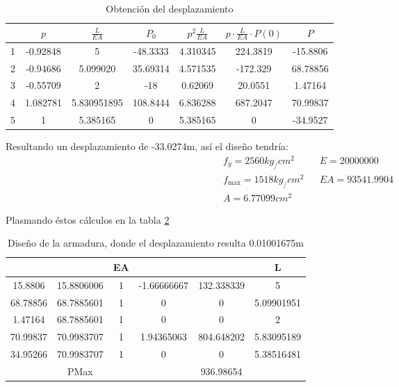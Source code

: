 \begin{table}[h!]
  \centering
  \begin{tabular}{@{}ccccccc@{}}
  \toprule
    & $p$      & $\frac{L}{EA}$ & $P_0$    & $p^2\frac{L}{EA}$ & $p\cdot \frac{L}{EA}\cdot P(0)$ & $P$      \\ \midrule
  1 & -0.92848 & 5            & -48.3333 & 4.310345    & 224.3819                & -15.8806 \\
  2 & -0.94686 & 5.099020     & 35.69314 & 4.571535    & -172.329                & 68.78856 \\
  3 & -0.55709 & 2            & -18      & 0.62069     & 20.0551                 & 1.47164  \\
  4 & 1.082781 & 5.830951895  & 108.8444 & 6.836288    & 687.2047                & 70.99837 \\
  5 & 1        & 5.385165     & 0        & 5.385165    & 0                       & -34.9527 \\ \bottomrule
  \end{tabular}
  \caption{Obtención del desplazamiento}
  \label{tabmm5}
\end{table}

Resultando un desplazamiento de -33.0274m, así el diseño tendría:
\begin{align*}
  &f_y = 2560kg_/cm^2&& E = 20000000\\
  &f_{\max } = 1518kg_/cm^2&&EA = 93541.9904\\
  &A = 6.77099cm^2
\end{align*}

Plasmando éstos cálculos en la tabla \ref{tabmm6}
\begin{table}[h!]
  \centering
  \begin{tabular}{@{}cccccc@{}}
  \toprule
           &                                    & EA &             &            & L          \\ \midrule
  15.8806  & 15.8806006                         & 1  & -1.66666667 & 132.338339 & 5          \\
  68.78856 & 68.7885601                         & 1  & 0           & 0          & 5.09901951 \\
  1.47164  & 68.7885601                         & 1  & 0           & 0          & 2          \\
  70.99837 & 70.9983707                         & 1  & 1.94365063  & 804.648202 & 5.83095189 \\
  34.95266 & 70.9983707                         & 1  & 0           & 0          & 5.38516481 \\
           & PMax                               &    &             & 936.98654  &            \\ \bottomrule
  \end{tabular}
  \caption{Diseño de la armadura, donde el desplazamiento resulta 0.01001675m}
  \label{tabmm6}
\end{table}

